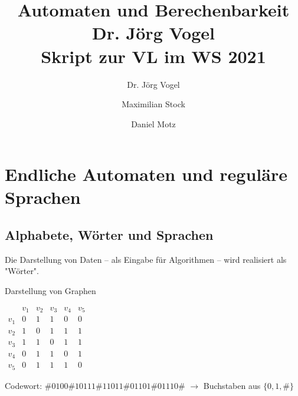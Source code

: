 \documentclass[runningheads]{llncs}
\begin{document}
%
\title{
    Automaten und Berechenbarkeit \\
    Dr. Jörg Vogel \\
    Skript zur VL im WS 2021
}
%
%
\author{
    Dr. Jörg Vogel \and 
    Maximilian Stock \and 
    Daniel Motz
}
%
%
%
\maketitle
%
\pagebreak

\section{Endliche Automaten und reguläre Sprachen}

\subsection{Alphabete, Wörter und Sprachen}

Die Darstellung von Daten -- als Eingabe für Algorithmen -- wird realisiert als "Wörter".

\begin{example}
    Darstellung von Graphen

    \begin{minipage}{.5\textwidth}
    \end{minipage} %
    \begin{minipage}{.5\textwidth}
        $\begin{matrix}
            & v_1 & v_2 & v_3 & v_4 & v_5 \\
        v_1 & 0 & 1 & 1 & 0 & 0 \\
        v_2 & 1 & 0 & 1 & 1 & 1 \\
        v_3 & 1 & 1 & 0 & 1 & 1 \\
        v_4 & 0 & 1 & 1 & 0 & 1 \\
        v_5 & 0 & 1 & 1 & 1 & 0
        \end{matrix}$
    \end{minipage}%
    \newline%
    \newline%
    Codewort: $\#0100\#10111\#11011\#01101\#01110\#$
    $\rightarrow$ Buchstaben aus $\{0, 1, \#\}$
\end{example}
\end{document}
